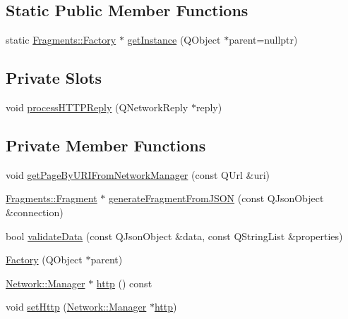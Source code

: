 \subsection*{Static Public Member Functions}
\begin{DoxyCompactItemize}
\item 
static \mbox{\hyperlink{classFragments_1_1Factory}{Fragments\+::\+Factory}} $\ast$ \mbox{\hyperlink{classFragments_1_1Factory_a32614388e70b2737a28c045ebbe58e55}{get\+Instance}} (Q\+Object $\ast$parent=nullptr)
\end{DoxyCompactItemize}
\subsection*{Private Slots}
\begin{DoxyCompactItemize}
\item 
void \mbox{\hyperlink{classFragments_1_1Factory_a0ee4ef4c4521a4bce9fe901236a14c84}{process\+H\+T\+T\+P\+Reply}} (Q\+Network\+Reply $\ast$reply)
\end{DoxyCompactItemize}
\subsection*{Private Member Functions}
\begin{DoxyCompactItemize}
\item 
void \mbox{\hyperlink{classFragments_1_1Factory_a9a5923caf97c4e8dba24e23539328deb}{get\+Page\+By\+U\+R\+I\+From\+Network\+Manager}} (const Q\+Url \&uri)
\item 
\mbox{\hyperlink{classFragments_1_1Fragment}{Fragments\+::\+Fragment}} $\ast$ \mbox{\hyperlink{classFragments_1_1Factory_a8f78a634fbeec2b7edb731d778947e97}{generate\+Fragment\+From\+J\+S\+ON}} (const Q\+Json\+Object \&connection)
\item 
bool \mbox{\hyperlink{classFragments_1_1Factory_a62a60fd81fec95b794a8b27188b51824}{validate\+Data}} (const Q\+Json\+Object \&data, const Q\+String\+List \&properties)
\item 
\mbox{\hyperlink{classFragments_1_1Factory_a04aefdf80a3318302fbb839b9322a12e}{Factory}} (Q\+Object $\ast$parent)
\item 
\mbox{\hyperlink{classNetwork_1_1Manager}{Network\+::\+Manager}} $\ast$ \mbox{\hyperlink{classFragments_1_1Factory_ae9f54ac342a7fd5010689d80ef343424}{http}} () const
\item 
void \mbox{\hyperlink{classFragments_1_1Factory_ae5738a3e881b1791dda120e34be3cea9}{set\+Http}} (\mbox{\hyperlink{classNetwork_1_1Manager}{Network\+::\+Manager}} $\ast$\mbox{\hyperlink{classFragments_1_1Factory_ae9f54ac342a7fd5010689d80ef343424}{http}})
\end{DoxyCompactItemize}
